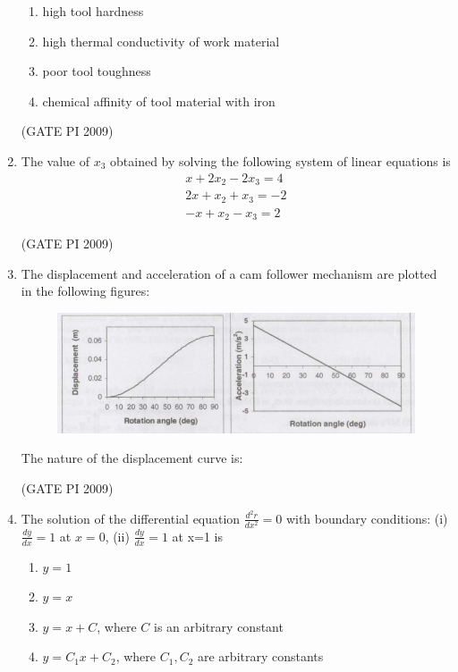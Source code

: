 \documentclass[journal,12pt,onecolumn]{IEEEtran}
\theoremstyle{remark}
\begin{document}
\begin{enumerate}[label=Q.\arabic*]
\begin{enumerate}
\item high tool hardness
\item high thermal conductivity of work material
\item poor tool toughness
\item chemical affinity of tool material with iron
\end{enumerate}
\hfill (GATE PI 2009)
\item The value of $x_3$ obtained by solving the following system of linear equations is
\begin{align*} 
x + 2x_2 - 2x_3 = 4 \\ 
2x + x_2 + x_3 = -2 \\
-x + x_2 - x_3 = 2
\end{align*}
\begin{enumerate}
\end{enumerate}
\hfill (GATE PI 2009)
\item The displacement and acceleration of a cam follower mechanism are plotted in the following figures:

\begin{figure}[h]
    \centering
    \includegraphics[width=0.5\linewidth]{figs/1.png}
    \label{fig:placeholder}
\end{figure} 
The nature of the displacement curve is:
\begin{enumerate}
\end{enumerate}
\hfill (GATE PI 2009)
\item The solution of the differential equation
$
\frac{d^2 r}{dx^2} = 0
$
with boundary conditions: (i) $\frac{dy}{dx} = 1$ at $x = 0$, (ii) $\frac{dy}{dx} = 1$ at x=1 is
\begin{enumerate}
\item $y = 1$ 
\item $y = x$ 
\item $y = x + C$, where $C$ is an arbitrary constant  
\item $y = C_1 x + C_2$, where $C_1, C_2$ are arbitrary constants 


\end{enumerate}
\end{enumerate}
\end{document}
